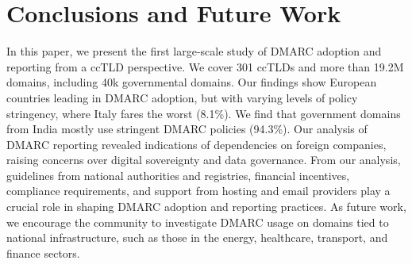 \section{Conclusions and Future Work}
\label{sec:conclusions}
In this paper, we present the first large-scale study of \gls{DMARC} adoption and reporting from a \gls{ccTLD} perspective. We cover 301 \glspl{ccTLD} and more than 19.2M domains, including 40k governmental domains.
Our findings show European countries leading in \gls{DMARC} adoption, but with varying levels of policy stringency, where Italy fares the worst (8.1\%). We find that government domains from India mostly use stringent \gls{DMARC} policies (94.3\%).
Our analysis of \gls{DMARC} reporting revealed indications of dependencies on foreign companies, raising concerns over digital sovereignty and data governance.
From our analysis, guidelines from national authorities and registries, financial incentives, compliance requirements, and support from hosting and email providers play a crucial role in shaping DMARC adoption and reporting practices.
As future work, we encourage the community to investigate \gls{DMARC} usage on domains tied to national infrastructure, such as those in the energy, healthcare, transport, and finance sectors.
